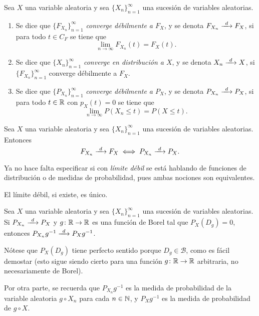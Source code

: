 \documentclass[a4paper, 11pt, extrafontsizes]{memoir}
\begin{document}
\begin{definition}
    Sea $X$ una variable aleatoria y sea $\{X_n\}_{n=1}^\infty$ una sucesión de variables aleatorias.
    \begin{enumerate}
        \item Se dice que $\{F_{X_n}\}_{n=1}^\infty$ \emph{converge débilmente a $F_X$}, y se denota $F_{X_n} \dconv F_X$,
        si para todo $t \in C_F$ se tiene que
        \[\lim_{n \to \infty} F_{X_n}(t)=F_X(t).\]
        \item Se dice que $\{X_n\}_{n=1}^\infty$ \emph{converge en distribución a $X$}, y se denota $X_n \dconv X$, si $\{F_{X_n}\}_{n=1}^\infty$ converge débilmente a $F_X$.
        \item Se dice que $\{P_{X_n}\}_{n=1}^\infty$ \emph{converge débilmente a $P_X$}, y se denota $P_{X_n} \dconv P_X$, si para todo $t \in \mathbb R$ con $p_X(t) = 0$ se tiene que
        \[\lim_{n \to \infty} P(X_n \leq t) = P(X \leq t).\]
    \end{enumerate}
\end{definition}
\begin{proposition}\label{pro:1.8.3}
    Sea $X$ una variable aleatoria y sea $\{X_n\}_{n=1}^\infty$ una sucesión de variables aleatorias. Entonces
    \[F_{X_n} \dconv F_X \iff P_{X_n} \dconv P_X.\]
\end{proposition}

Ya no hace falta especificar si con \emph{límite débil} se está hablando de funciones de distribución o de medidas de probabilidad, pues ambas nociones son equivalentes.

\begin{proposition}
    El límite débil, si existe, es único.
\end{proposition}

\begin{theorem}
    Sea $X$ una variable aleatoria y sea $\{X_n\}_{n=1}^\infty$ una sucesión de variables aleatorias. Si $P_{X_n} \dconv P_X$ y $g \colon \mathbb R \to \mathbb R$ es una función de Borel tal que $P_X(D_g) = 0$, entonces $P_{X_n}g^{-1} \dconv P_Xg^{-1}$.
\end{theorem}

Nótese que $P_X(D_g)$ tiene perfecto sentido porque $D_g \in \mathcal{B}$, como es fácil demostar (esto sigue siendo cierto para una función $g \colon \mathbb R \to \mathbb R$ arbitraria, no necesariamente de Borel).

Por otra parte, se recuerda que $P_{X_n}g^{-1}$ es la medida de probabilidad de la variable aleatoria $g \circ X_n$ para cada $n \in \mathbb N$, y $P_Xg^{-1}$ es la medida de probabilidad de $g \circ X$.
\end{document}
